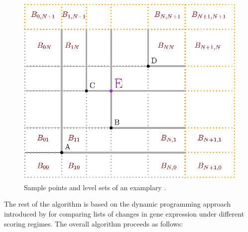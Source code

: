 \begin{figure}
	\centering \includegraphics[scale=1]{./img/KS2.eps}
	\caption{Sample points and level sets of an examplary \ecdf.}\label{spaceDivision}
\end{figure}


The rest of the algorithm is based on the dynamic programming approach introduced by \citet*{NiVingron} for comparing lists of changes in gene expression under different scoring regimes. The overall algorithm proceeds as follows:

